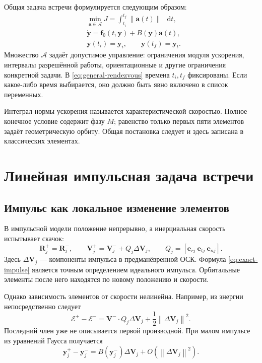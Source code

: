 \documentclass[a4paper,11pt]{article}
\newcommand{\dd}{\mathop{}\!\mathrm d}
\numberwithin{equation}{section}
\theoremstyle{remark}
\newcommand{\vect}[1]{\boldsymbol{#1}}
\newcommand{\norm}[1]{\left\lVert#1\right\rVert}
\begin{document}
Общая задача встречи формулируется следующим образом:
\begin{equation}
 \begin{aligned}
  &\min_{\vect a\in\mathcal A}
     J=\int_{t_i}^{t_f}\norm{\vect a(t)}\,\dd t,\\
  &\dot{\vect y}=\vect f_0(t,\vect y)+B(\vect y)\vect a(t),\\
  &\vect y(t_i)=\vect y_i,\qquad \vect y(t_f)=\vect y_t.
 \end{aligned}
 \label{eq:general-rendezvous}
\end{equation}
Множество $\mathcal A$ задаёт допустимое управление: ограничения
модуля ускорения, интервалы разрешённой работы, ориентационные
и другие ограничения конкретной задачи. В \eqref{eq:general-rendezvous}
времена $t_i,t_f$ фиксированы. Если какое-либо время выбирается,
оно должно быть явно включено в список переменных.

Интеграл нормы ускорения называется характеристической скоростью.
Полное конечное условие содержит фазу $M$;
равенство только первых пяти элементов задаёт геометрическую орбиту.
Общая постановка следует \cite{chiniaev} и здесь записана
в классических элементах.

\FloatBarrier
\section{Линейная импульсная задача встречи}
\label{sec:linear}

\subsection{Импульс как локальное изменение элементов}

В импульсной модели положение непрерывно, а инерциальная скорость
испытывает скачок:
\begin{equation}
 \vect R_j^+=\vect R_j^-,\qquad
 \vect V_j^+=\vect V_j^-+Q_j\Delta\vect V_j,
 \qquad Q_j=[\vect e_{rj}\ \vect e_{tj}\ \vect e_{nj}].
 \label{eq:exact-impulse}
\end{equation}
Здесь $\Delta\vect V_j$ --- компоненты импульса в предманёвренной
ОСК. Формула \eqref{eq:exact-impulse} является точным определением
идеального импульса. Орбитальные элементы после него находятся
по новому положению и скорости.

Однако зависимость элементов от скорости нелинейна. Например,
из энергии непосредственно следует
\[
 \mathcal E^+-\mathcal E^-
 =\vect V^-\cdot Q_j\Delta\vect V_j
             +\frac12\norm{\Delta\vect V_j}^2.
\]
Последний член уже не описывается первой производной.
При малом импульсе из уравнений Гаусса получается
\begin{equation}
 \vect y_j^+-\vect y_j^-
 =B(\vect y_j^-)\Delta\vect V_j
                  +O(\norm{\Delta\vect V_j}^2).
 \label{eq:linear-impulse}
\end{equation}
\end{document}

